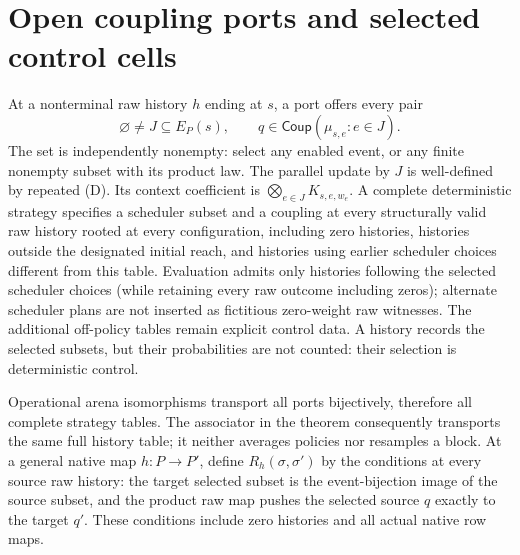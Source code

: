 \documentclass[11pt]{article}
\begin{document}
\section{Open coupling ports and selected control cells}
At a nonterminal raw history $h$ ending at $s$, a port offers every pair
\[
 \varnothing\ne J\subseteq E_P(s),\qquad
 q\in\mathsf{Coup}(\mu_{s,e}:e\in J).
\]
The set is independently nonempty: select any enabled event, or any finite nonempty subset with its product law. The parallel update by $J$ is well-defined by repeated (D). Its context coefficient is $\bigotimes_{e\in J}K_{s,e,w_e}$. A complete deterministic strategy specifies a scheduler subset and a coupling at every structurally valid raw history rooted at every configuration, including zero histories, histories outside the designated initial reach, and histories using earlier scheduler choices different from this table. Evaluation admits only histories following the selected scheduler choices (while retaining every raw outcome including zeros); alternate scheduler plans are not inserted as fictitious zero-weight raw witnesses. The additional off-policy tables remain explicit control data. A history records the selected subsets, but their probabilities are not counted: their selection is deterministic control.

Operational arena isomorphisms transport all ports bijectively, therefore all complete strategy tables. The associator in the theorem consequently transports the same full history table; it neither averages policies nor resamples a block. At a general native map $h:P\to P'$, define $R_h(\sigma,\sigma')$ by the conditions at every source raw history: the target selected subset is the event-bijection image of the source subset, and the product raw map pushes the selected source $q$ exactly to the target $q'$. These conditions include zero histories and all actual native row maps.
\end{document}
